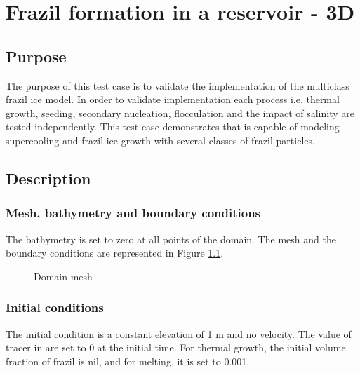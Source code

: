 \renewcommand{\labelitemi}{$\triangleright$}

\chapter{Frazil formation in a reservoir - 3D}
%
%
\section{Purpose}

The purpose of this test case is to validate the implementation of the multiclass frazil ice model.
In order to validate implementation each process i.e. thermal growth, 
seeding, secondary nucleation, flocculation and the impact of salinity are tested independently.
This test case demonstrates that \khione is capable of modeling 
supercooling and frazil ice growth with several classes of frazil particles.

\section{Description}

\subsection{Mesh, bathymetry and boundary conditions}

The bathymetry is set to zero at all points of the domain. The mesh and the boundary conditions are represented in Figure \ref{fig:res_mesh}.

\begin{figure}[H]
    \begin{center}
    \end{center}
    \caption{Domain mesh}
    \label{fig:res_mesh}
\end{figure}

\subsection{Initial conditions}

The initial condition is a constant elevation of 1 m and no velocity. The value of tracer in  are set to 0 at the initial time. For thermal growth, the initial volume fraction of frazil is nil, and for melting, it is set to 0.001.

